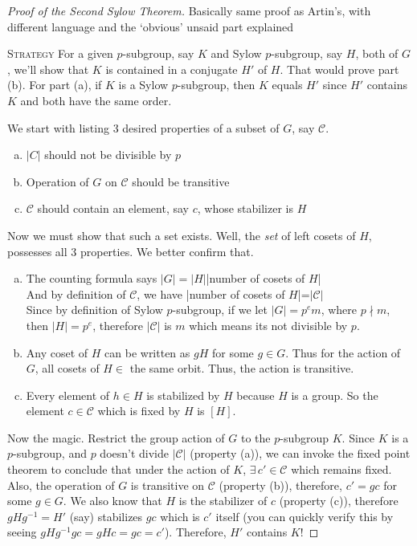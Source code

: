 \documentclass[12pt]{article}
\begin{document}
\begin{proof}[Proof of the Second Sylow Theorem] Basically same proof as Artin's, with different language and the `obvious' unsaid part explained
\par
\textsc {Strategy } For a given $p$-subgroup, say $K$ and Sylow $p$-subgroup, say $H$, both of $G$, we'll show that $K$ is contained in a conjugate $H'$ of $H$. That would prove part (b). For part (a), if $K$ is a Sylow $p$-subgroup, then $K$ equals $H'$ since $H'$ contains $K$ and both have the same order.
\par
We start with listing 3 desired properties of a subset of $G$, say $\mathcal C$. 
\begin{enumerate}[(a)]
\item $\mathcal |C|$ should not be divisible by $p$
\item Operation of $G$ on $\mathcal C$ should be transitive
\item $\mathcal C$ should contain an element, say $c$, whose stabilizer is $H$
\end{enumerate}
Now we must show that such a set exists. Well, the \emph{set} of left cosets of $H$, possesses all 3 properties. We better confirm that.
\begin{enumerate}[(a)]
\item The counting formula says $|G|=|H|$|number of cosets of $H$|\\
And by definition of $\mathcal C$, we have |number of cosets of $H$|=$| \mathcal C|$\\
Since by definition of Sylow $p$-subgroup, if we let $|G|=p^{e}m$, where $p \nmid m$, then $|H|=p^{e}$, therefore $| \mathcal C|$ is $m$ which means its not divisible by $p$.
\item Any coset of $H$ can be written as $gH$ for some $g \in G$. Thus for the action of $G$, all cosets of $H \in$ the same orbit. Thus, the action is transitive.
\item Every element of $h \in H$ is stabilized by $H$ because $H$ is a group. So the element $c \in \mathcal C$ which is fixed by $H$ is $[H]$.
\end{enumerate}
\par
Now the magic. Restrict the group action of $G$ to the $p$-subgroup $K$. Since $K$ is a $p$-subgroup, and $p$ doesn't divide $| \mathcal C|$ (property (a)), we can invoke the fixed point theorem to conclude that under the action of $K$, $\exists\,c' \in \mathcal C$ which remains fixed. \\
Also, the operation of $G$ is transitive on $\mathcal C$ (property (b)), therefore, $c'=gc$ for some $g \in G$. We also know that $H$ is the stabilizer of $c$ (property (c)), therefore $gHg^{-1}=H'$ (say) stabilizes $gc$ which is $c'$ itself (you can quickly verify this by seeing $gHg^{-1}gc=gHc=gc=c'$). Therefore, $H'$ contains $K$!
\end{proof}
\end{document}
